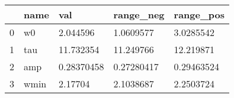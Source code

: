 \begin{tabular}{lllll}
\toprule
{} &  name &         val &   range\_neg &   range\_pos \\
\midrule
0 &    w0 &    2.044596 &   1.0609577 &   3.0285542 \\
1 &   tau &   11.732354 &   11.249766 &   12.219871 \\
2 &   amp &  0.28370458 &  0.27280417 &  0.29463524 \\
3 &  wmin &     2.17704 &   2.1038687 &   2.2503724 \\
\bottomrule
\end{tabular}
